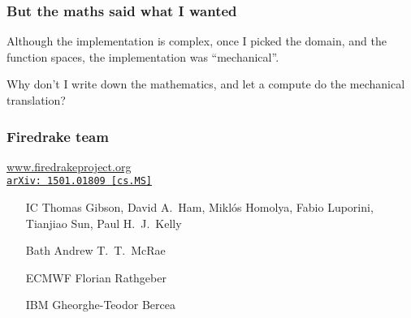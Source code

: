 \documentclass[presentation]{beamer}
\newcommand{\arxivlink}[2]{%
  \href{http://www.arxiv.org/abs/#1}%
  {{\small\texttt{arXiv:\,#1\,[#2]}}}%
}
\begin{document}
\begin{frame}
  \frametitle{But the maths said what I wanted}

  Although the implementation is complex, once I picked the domain,
  and the function spaces, the implementation was ``mechanical''.

  Why don't I write down the mathematics, and let a compute do the
  mechanical translation?
\end{frame}

\begin{frame}
  \frametitle{Firedrake team}
  \begin{center}
    \url{www.firedrakeproject.org}\\
    \cite{Rathgeber:2016} \arxivlink{1501.01809}{cs.MS}
  \end{center}

  \begin{itemize}
  \item[IC] Thomas Gibson, David A.~Ham, Mikl\'os Homolya, {\color{gray}Fabio
    Luporini}, Tianjiao Sun, Paul H.~J.~Kelly
  \item[Bath] Andrew T.~T.~McRae
  \item[\color{gray}ECMWF] \color{gray}Florian Rathgeber
  \item[\color{gray}IBM] \color{gray}Gheorghe-Teodor Bercea
  \end{itemize}
\end{frame}
\end{document}
